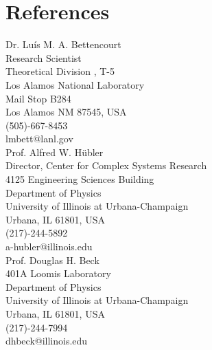\section{\sc References} %

Dr. Lu{\'i}s M. A. Bettencourt\\
Research Scientist\\
Theoretical Division , T-5\\
Los Alamos National Laboratory\\
Mail Stop B284\\
Los Alamos NM 87545, USA\\
(505)-667-8453\\
lmbett@lanl.gov\\

Prof. Alfred W. H{\"u}bler\\
Director, Center for Complex Systems Research\\
4125 Engineering Sciences Building\\
Department of Physics\\
University of Illinois at Urbana-Champaign\\
Urbana, IL 61801, USA\\
(217)-244-5892\\
a-hubler@illinois.edu \\

Prof. Douglas H. Beck\\
401A Loomis Laboratory\\
Department of Physics\\
University of Illinois at Urbana-Champaign\\
Urbana, IL 61801, USA\\
(217)-244-7994\\
dhbeck@illinois.edu

